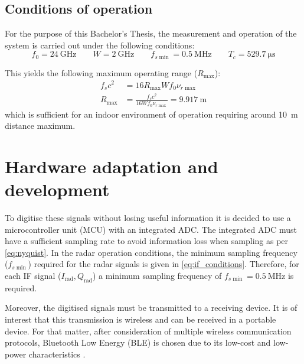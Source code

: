 \subsection{Conditions of operation}
For the purpose of this Bachelor's Thesis, the measurement and operation of the system is carried out under the following conditions:
\begin{equation} \label{eq:if_conditions}
	f_0 = \SI{24}{\giga\hertz} \qquad W = \SI{2}{\giga\hertz} \qquad f_{s\min} = \SI{0.5}{\mega\hertz} \qquad T_c = \SI{529.7}{\micro\second}
\end{equation}

This yields the following maximum operating range ($R_{\max}$):
\begin{align}
	f_s c^2 &= 16 R_{\max}W f_0 \nu_{r\max} \\
	R_{\max} &= \frac{f_s c^2}{16 W f_0 \nu_{r\max}} = \SI{9.917}{\meter}
\end{align}
which is sufficient for an indoor environment of operation requiring around \SI{10}{\meter} distance maximum.

\section{Hardware adaptation and development}
To digitise these signals without losing useful information it is decided to use a microcontroller unit (MCU) with an integrated ADC. The integrated ADC must have a sufficient sampling rate to avoid information loss when sampling as per \cref{eq:nyquist}. In the radar operation conditions, the minimum sampling frequency ($f_{s\min}$) required for the radar signals is given in \cref{eq:if_conditions}. Therefore, for each IF signal ($I_\mathrm{rad}, Q_\mathrm{rad}$) a minimum sampling frequency of $f_{s\min} = \SI{0.5}{\mega\hertz}$ is required.

Moreover, the digitised signals must be transmitted to a receiving device. It is of interest that this transmission is wireless and can be received in a portable device. For that matter, after consideration of multiple wireless communication protocols, Bluetooth Low Energy (BLE) is chosen due to its low-cost and low-power characteristics \cite{Gomez2012}.

